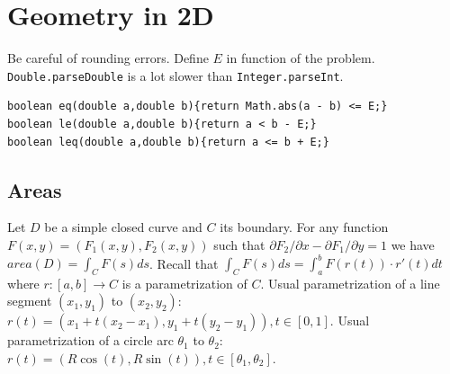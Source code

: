 \section{Geometry in 2D}
Be careful of rounding errors. Define $E$ in function of the problem.
\lstinline|Double.parseDouble| is a lot slower than \lstinline|Integer.parseInt|.
\begin{lstlisting}
boolean eq(double a,double b){return Math.abs(a - b) <= E;}
boolean le(double a,double b){return a < b - E;}
boolean leq(double a,double b){return a <= b + E;}
\end{lstlisting}


\subsection{Areas}
Let $D$ be a simple closed curve and $C$ its boundary. For any
function $F(x, y) = (F_1(x, y), F_2(x, y))$ such that $\partial F_2 \slash \partial x - \partial F_1 \slash \partial y =  1$
we have $\textit{area}(D) = \int_C F(s) ds$. Recall that $\int_C F(s) ds = \int_a^b F(r(t)) \cdot r'(t) dt$ where $r : [a, b] \rightarrow C$
is a parametrization of $C$. Usual parametrization of a line segment $(x_1, y_1)$ to $(x_2, y_2)$: $r(t) = (x_1 + t(x_2 - x_1), y_1 + t(y_2 - y_1)), t \in [0, 1]$. Usual parametrization
of a circle arc $\theta_1$ to $\theta_2$: $r(t) = (R \cos(t), R \sin(t)), t \in [\theta_1, \theta_2]$.

